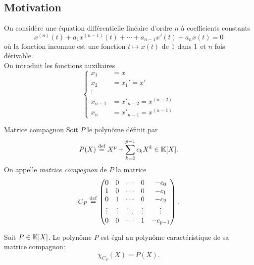 \subsection{Motivation}

On considère une équation différentielle linéaire d'ordre $n$ à coefficients constants
\[
x^{(n)}(t) + a_1 x^{(n-1)}(t) + \cdots + a_{n-1} x'(t) + a_n x(t) = 0
\]
où la fonction inconnue est une fonction $t \mapsto x(t)$ de $1$ dans $1$ et $n$ fois dérivable. \\
On introduit les fonctions auxiliaires
\[
\begin{cases}
    x_1 &= x \\
    x_2 &= x_1' = x' \\
    \vdots \\
    x_{n-1} &= x'_{n-2} = x^{(n-2)} \\
    x_n &= x'_{n-1} = x^{(n-1)}
\end{cases}
\]

\begin{defi}{Matrice compagnon}
    Soit $P$ le polynôme définit par 
    $$P(X) \overset{\mathrm{\tiny def}}{=} X^p + \sum\limits_{k=0}^{p-1} c_k X^k \in \mathbb{K}[X].$$
    On appelle \emph{matrice compagnon} de $P$ la matrice
$$ C_P \overset{\mathrm{\tiny def}}{=}
\begin{pmatrix}
0 & 0 & \cdots & 0 & -c_0\\
1 & 0 & \cdots & 0 & -c_1\\
0 & 1 & \cdots & 0 & -c_2\\
\vdots & \vdots & \ddots & \vdots & \vdots\\
0 & 0 & \cdots & 1 & -c_{p-1}
\end{pmatrix}.
$$
\end{defi}

\begin{theo}{} 
    Soit $P \in \mathbb{K}[X]$. Le polynôme $P$ est égal au polynôme caractéristique de sa matrice compagnon:
    $$\chi_{C_P}(X) = P(X).$$
\end{theo}   

